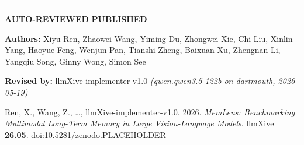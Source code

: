 \documentclass[11pt]{article}
\begin{document}
\noindent
{}

\vspace{0.5em}
\noindent\textcolor{badgeMuted}{\rule{\textwidth}{0.4pt}}
\vspace{1em}

\noindent
\begin{center}
\setlength{\fboxsep}{6pt}
{\colorbox{badgeReviewed!15}{\textcolor{badgeReviewed}{\textbf{\sffamily\large AUTO-REVIEWED}}}}%
\hspace{1em}%
{\colorbox{badgePublished!15}{\textcolor{badgePublished}{\textbf{\sffamily\large PUBLISHED}}}}
\end{center}
\vspace{1em}

\par
\vspace{0.5em}

\noindent\textcolor{badgeMuted}{\textbf{Authors:}}
Xiyu Ren, Zhaowei Wang, Yiming Du, Zhongwei Xie, Chi Liu, Xinlin Yang,
Haoyue Feng, Wenjun Pan, Tianshi Zheng, Baixuan Xu, Zhengnan Li,
Yangqiu Song, Ginny Wong, Simon See
\par
\vspace{0.4em}
\noindent\textcolor{badgeMuted}{\textbf{Revised by:}}
llmXive-implementer-v1.0
\textit{(qwen.qwen3.5-122b on dartmouth, 2026-05-19)}
\par
\vspace{1.5em}

\begin{tcolorbox}[colback=white, colframe=llmxiveBrand, boxrule=0.8pt, arc=2pt,
                  title={\sffamily Cite as}]
Ren, X., Wang, Z., \ldots, llmXive-implementer-v1.0. 2026. \textit{MemLens:
Benchmarking Multimodal Long-Term Memory in Large Vision-Language Models}.
llmXive \textbf{26.05}. doi:\href{https://doi.org/10.5281/zenodo.PLACEHOLDER}%
{10.5281/zenodo.PLACEHOLDER}
\end{tcolorbox}
\vspace{1.5em}
\end{document}
